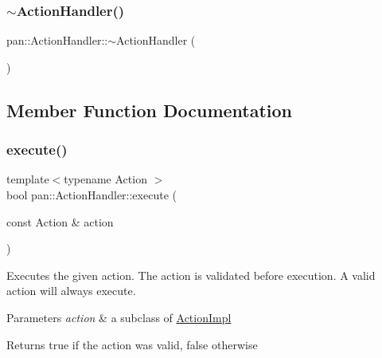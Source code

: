 \mbox{\label{classpan_1_1_action_handler_a5bf64631c974765b04def48c0df0fcd7}} 
\subsubsection{\texorpdfstring{$\sim$\+Action\+Handler()}{~ActionHandler()}}
{\footnotesize\ttfamily pan\+::\+Action\+Handler\+::$\sim$\+Action\+Handler (\begin{DoxyParamCaption}{ }\end{DoxyParamCaption})}



\subsection{Member Function Documentation}
\mbox{\label{classpan_1_1_action_handler_a7c5cefcd45fe538da04762de3cac0dbd}} 
\subsubsection{\texorpdfstring{execute()}{execute()}\hspace{0.1cm}{\footnotesize\ttfamily [1/14]}}
{\footnotesize\ttfamily template$<$typename Action $>$ \\
bool pan\+::\+Action\+Handler\+::execute (\begin{DoxyParamCaption}\item[{const Action \&}]{action }\end{DoxyParamCaption})}

Executes the given action. The action is validated before execution. A valid action will always execute. 
\begin{DoxyParams}{Parameters}
{\em action} & a subclass of \hyperlink{classpan_1_1_action_impl}{Action\+Impl} \\
\hline
\end{DoxyParams}
\begin{DoxyReturn}{Returns}
true if the action was valid, false otherwise 
\end{DoxyReturn}
\mbox{\label{classpan_1_1_action_handler_a97f0f5801dedcbc42396f185686083bb}} 
